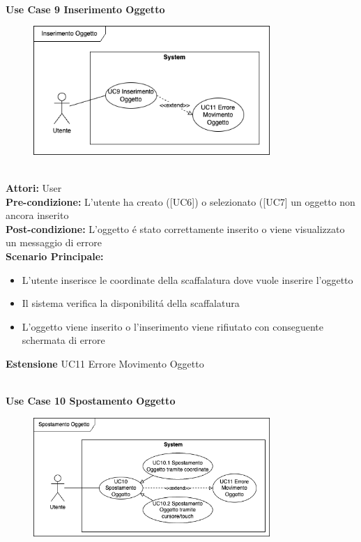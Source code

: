 \vspace{0.5cm}


\Large\textbf{}\\
\Large\textbf{Use Case 9 Inserimento Oggetto} \\
\begin{figure}[h]
 \centering
  \includegraphics[width=0.8\textwidth]{UseCasesImages/ObjInsert.drawio.png}
\end{figure}

\vspace{0.5cm}

\large\textbf{} \\
\textbf{Attori:} User\\
\textbf{Pre-condizione:} L'utente ha creato ([UC6]) o selezionato ([UC7] un oggetto non ancora inserito  \\
\textbf{Post-condizione: } L'oggetto é stato correttamente inserito o viene visualizzato un messaggio di errore\\
\textbf{Scenario Principale:} 
\begin{itemize}
    \item L'utente inserisce le coordinate della scaffalatura dove vuole inserire l'oggetto
    \item Il sistema verifica la disponibilitá della scaffalatura
    \item L'oggetto viene inserito o l'inserimento viene rifiutato con conseguente schermata di errore
\end{itemize}
\textbf{Estensione} UC11 Errore Movimento Oggetto

\vspace{0.5cm}

\Large\textbf{}\\
\Large\textbf{Use Case 10 Spostamento Oggetto} \\
\begin{figure}[h]
 \centering
 \includegraphics[width=0.8\textwidth]{UseCasesImages/ObjMovement.drawio.png}
\end{figure}

